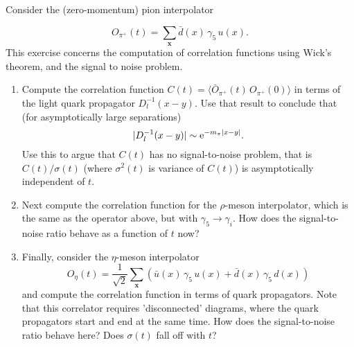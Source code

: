 Consider the (zero-momentum) pion interpolator

\begin{equation}
	O_{\pi^{+}}(t) = \sum_{\textbf{x}} \bar{d}(x) \, \gamma_5\, u(x). 
\end{equation}
This exercise concerns the computation of correlation functions using Wick's theorem, and the signal to noise problem. 
\begin{enumerate}
	\item Compute the correlation function $C(t) = \langle \bar{O}_{\pi^{+}}(t) \, O_{\pi^{+}}(0) \rangle$ in terms of the light quark propagator $D_{l}^{-1}(x-y)$. Use that result to conclude that (for asymptotically large separations)
		\begin{equation}
			|D_{l}^{-1}(x-y)| \sim {\rm e}^{-m_{\pi}|x-y|}.
		\end{equation}
		Use this to argue that $C(t)$ has no signal-to-noise problem, that is $C(t)/\sigma(t)$ (where $\sigma^2(t)$ is variance of $C(t)$) is asymptotically independent of $t$.  
	\item Next compute the correlation function for the $\rho$-meson interpolator, which is the same as the operator above, but with $\gamma_5 \rightarrow \gamma_i$. How does the signal-to-noise ratio behave as a function of $t$ now?
	\item Finally, consider the $\eta$-meson interpolator 
		\begin{equation}
			O_{\eta}(t) = \frac{1}{\sqrt{2}}\sum_{\textbf{x}}\left( \bar{u}(x)\,\gamma_5\,u(x) + \bar{d}(x) \, \gamma_5\, d(x)\right)  
		\end{equation}
		and compute the correlation function in terms of quark propagators. Note that this correlator requires 'disconnected' diagrams, where the quark propagators start and end at the same time. How does the signal-to-noise ratio behave here? Does $\sigma(t)$ fall off with $t$?  
\end{enumerate}